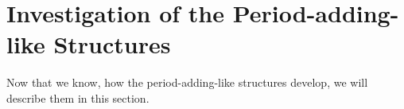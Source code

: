 \section{Investigation of the Period-adding-like Structures}
\label{sec:add.add}

Now that we know, how the period-adding-like structures develop, we will describe them in this section.






